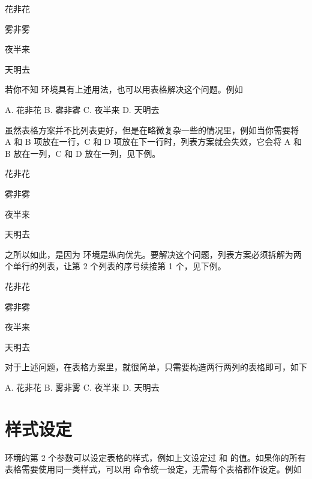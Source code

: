 \startexample
{}
\item 花非花 \item 雾非雾 \item 夜半来 \item 天明去
\stopitemize
\stopexample
\simpleexample[option=TEX]{\null}
\getexample

若你不知  环境具有上述用法，也可以用表格解决这个问题。例如

\startexample
\starttabulate[|p|p|p|p|]
\NC A. 花非花 \NC B. 雾非雾 \NC C. 夜半来 \NC D. 天明去 \NR
\stoptabulate
\stopexample
\simpleexample[option=TEX]{\null}

\noindent 虽然表格方案并不比列表更好，但是在略微复杂一些的情况里，例如当你需要将 A 和 B 项放在一行，C 和 D 项放在下一行时，列表方案就会失效，它会将 A 和 B 放在一列，C 和 D 放在一列，见下例。

\startexample
{}
\item 花非花 \item 雾非雾 \item 夜半来 \item 天明去
\stopitemize
\stopexample
\simpleexample[option=TEX]{\null}
\getexample
\blank[halfline]

\noindent 之所以如此，是因为  环境是纵向优先。要解决这个问题，列表方案必须拆解为两个单行的列表，让第 2 个列表的序号续接第 1 个，见下例。

\startexample
{}
\item 花非花 \item 雾非雾
\stopitemize
{}  
\item 夜半来 \item 天明去
\stopitemize
\stopexample
\simpleexample[option=TEX]{\null}
\getexample
\blank[halfline]

对于上述问题，在表格方案里，就很简单，只需要构造两行两列的表格即可，如下

\startTEX
\starttabulate[|p|p|]
\NC A. 花非花 \NC B. 雾非雾 \NR
\NC C. 夜半来 \NC D. 天明去 \NR
\stoptabulate
\stopTEX

\section{样式设定}

 环境的第 2 个参数可以设定表格的样式，例如上文设定过  和  的值。如果你的所有表格需要使用同一类样式，可以用  命令统一设定，无需每个表格都作设定。例如

